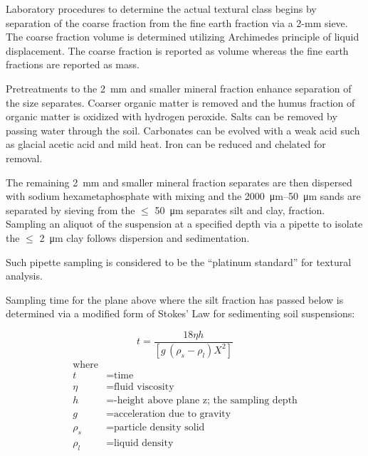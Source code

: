 \documentclass[letterpaper, 12pt]{article}
\begin{document}
Laboratory procedures to determine the actual textural class begins by separation of the coarse fraction from the fine earth fraction via a 2-mm sieve. The coarse fraction volume is determined utilizing Archimedes principle of liquid displacement. The coarse fraction is reported as volume whereas the fine earth fractions are reported as mass.

Pretreatments to the 2~mm and smaller mineral fraction enhance separation of the size separates. Coarser organic matter is removed and the humus fraction of organic matter is oxidized with hydrogen peroxide. Salts can be removed by passing water through the soil. Carbonates can be evolved with a weak acid such as glacial acetic acid and mild heat. Iron can be reduced and chelated for removal.

The remaining \qty{2}{mm} and smaller mineral fraction separates are then dispersed with sodium hexametaphosphate with mixing and the \qtyrange{2000}{50}{\micro\metre} sands are separated by sieving from the $\leq$ \qty{50}{\micro\metre} separates silt and clay, fraction. Sampling an aliquot of the suspension at a specified depth via a pipette to isolate the $\leq$ \qty{2}{\micro\metre} clay follows dispersion and sedimentation.

Such pipette sampling is considered to be the “platinum standard” for textural analysis.

Sampling time for the plane above where the silt fraction has passed below is determined via a modified form of Stokes’ Law for sedimenting soil suspensions:

\noindent\begin{minipage}{\textwidth}
\begin{equation}
    t=\frac{18\eta h}{[g\,(\rho_s - \rho_l)X^2]}
\end{equation}
\begin{equation*}
    \begin{aligned}
        \text{where}                                          \\
        t &= \text{time}                                      \\
        \eta &= \text{fluid viscosity}                        \\
        h &= \text{-height above plane z; the sampling depth} \\
        g &= \text{acceleration due to gravity}               \\
        \rho_s &= \text{particle density solid}               \\
        \rho_l &= \text{liquid density}
    \end{aligned}
\end{equation*}
\end{minipage}
        
\end{document}
